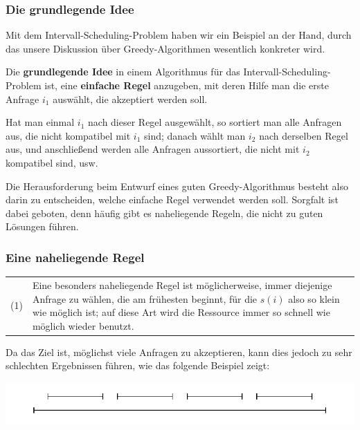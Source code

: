 \documentclass[smaller]{beamer}
\begin{document}
\begin{frame}
 \frametitle{Die grundlegende Idee}
 Mit dem Intervall-Scheduling-Problem haben wir ein Beispiel an der Hand, durch das unsere Diskussion über Greedy-Algorithmen \alert{wesentlich konkreter} wird. \\ \vspace*{0.2cm}

\alert{Die \textbf{grundlegende Idee} in einem Algorithmus für das Intervall-Scheduling-Problem ist, eine \textbf{einfache Regel} anzugeben, mit deren Hilfe man die erste Anfrage $i_1$ auswählt, die akzeptiert werden soll}. \\ \vspace*{0.2cm}

Hat man einmal $i_1$ nach dieser Regel ausgewählt, so sortiert man alle Anfragen aus, die nicht kompatibel mit $i_1$ sind; danach wählt man $i_2$ nach derselben Regel aus, und anschließend werden alle Anfragen aussortiert, die nicht mit $i_2$ kompatibel sind, usw. \\ \vspace*{0.2cm}

Die Herausforderung beim Entwurf eines guten Greedy-Algorithmus besteht also darin zu entscheiden, \alert{welche} einfache Regel verwendet werden soll. Sorgfalt ist dabei geboten, denn häufig gibt es naheliegende Regeln, die nicht zu guten Lösungen führen. 
\end{frame}

\begin{frame}
\frametitle{Eine naheliegende Regel}
\begin{tabular}{p{0.5cm}p{10cm}} 
(1) & Eine besonders naheliegende Regel ist möglicherweise, \alert{immer diejenige Anfrage zu wählen, die am frühesten beginnt}, für die $s(i)$ also so klein wie möglich ist; auf diese Art wird die Ressource immer so schnell wie möglich wieder benutzt.
\end{tabular}
\medskip

Da das Ziel ist, möglichst viele Anfragen zu akzeptieren, kann dies jedoch zu sehr schlechten Ergebnissen führen, wie das folgende Beispiel zeigt:

\begin{center}
\includegraphics{fig70.pdf}
\end{center}
\end{frame}
\end{document}
